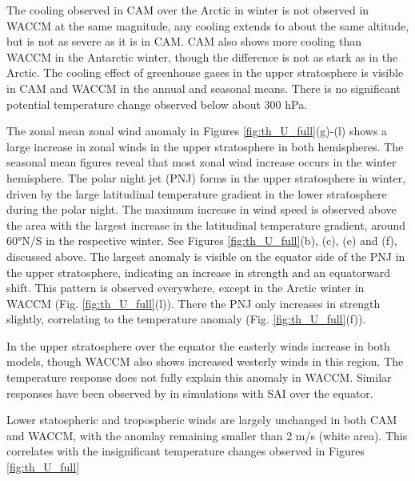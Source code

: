 The cooling observed in CAM over the Arctic in winter is not observed in WACCM at the same magnitude, any cooling extends to about the same altitude, but is not as severe as it is in CAM. CAM also shows more cooling than WACCM in the Antarctic winter, though the difference is not as stark as in the Arctic. The cooling effect of greenhouse gases in the upper stratosphere is visible in CAM and WACCM in the annual and seasonal means. There is no significant potential temperature change observed below about 300 hPa. 

The zonal mean zonal wind anomaly in Figures \ref{fig:th_U_full}(g)-(l) shows a large increase in zonal winds in the upper stratosphere in both hemispheres. The seasonal mean figures reveal that most zonal wind increase occurs in the winter hemisphere. The polar night jet (PNJ) forms in the upper stratosphere in winter, driven by the large latitudinal temperature gradient in the lower stratosphere during the polar night. The maximum increase in wind speed is observed above the area with the largest increase in the latitudinal temperature gradient, around 60°N/S in the respective winter. See Figures \ref{fig:th_U_full}(b), (c), (e) and (f), discussed above. The largest anomaly is visible on the equator side of the PNJ in the upper stratosphere, indicating an increase in strength and an equatorward shift. This pattern is observed everywhere, except in the Arctic winter in WACCM (Fig. \ref{fig:th_U_full}(l)). There the PNJ only increases in strength slightly, correlating to the temperature anomaly (Fig. \ref{fig:th_U_full}(f)). 

In the upper stratosphere over the equator the easterly winds increase in both models, though WACCM also shows increased westerly winds in this region. The temperature response does not fully explain this anomaly in WACCM. Similar responses have been observed by \textcite{bednarz2023climate} in simulations with SAI over the equator.

Lower statospheric and tropospheric winds are largely unchanged in both CAM and WACCM, with the anomlay remaining smaller than 2 m/s (white area). This correlates with the insignificant temperature changes observed in Figures \ref{fig:th_U_full}

